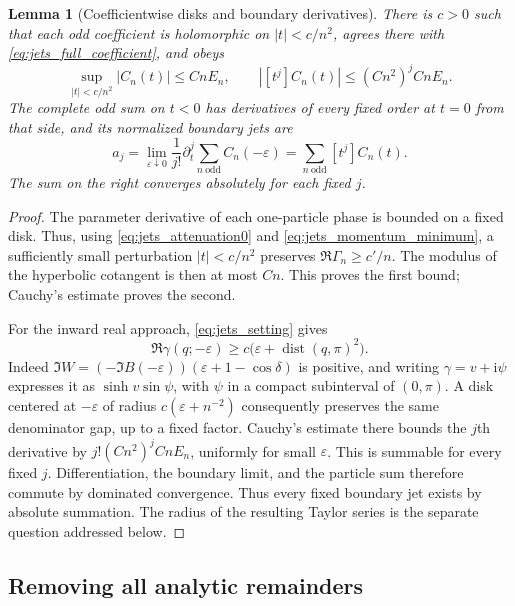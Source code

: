 \documentclass[11pt]{article}
\numberwithin{equation}{section}
\newtheorem{lemma}[theorem]{Lemma}
\theoremstyle{definition}
\newcommand{\ii}{\mathrm i}
\newcommand{\eps}{\varepsilon}
\newcommand{\dist}{\operatorname{dist}}
\begin{document}
\begin{lemma}[Coefficientwise disks and boundary derivatives]
\label{lem:jets_boundary_derivatives}
There is $c>0$ such that each odd coefficient is holomorphic on
$|t|<c/n^2$, agrees there with \eqref{eq:jets_full_coefficient}, and
obeys
\begin{equation}\label{eq:jets_small_disk}
 \sup_{|t|<c/n^2}|C_n(t)|\le CnE_n,
 \qquad |[t^j]C_n(t)|\le (Cn^2)^j CnE_n.
\end{equation}
The complete odd sum on $t<0$ has derivatives of every fixed order at
$t=0$ from that side, and its normalized boundary jets are
\begin{equation}\label{eq:jets_boundary_coefficients}
 a_j=\lim_{\eps\downarrow0}\frac1{j!}
       \partial_t^j\sum_{n\ \mathrm{odd}}C_n(-\eps)
     =\sum_{n\ \mathrm{odd}}[t^j]C_n(t).
\end{equation}
The sum on the right converges absolutely for each fixed $j$.
\end{lemma}

\begin{proof}
The parameter derivative of each one-particle phase is bounded on a
fixed disk. Thus, using \eqref{eq:jets_attenuation0} and
\eqref{eq:jets_momentum_minimum}, a sufficiently small perturbation
$|t|<c/n^2$ preserves $\Re\Gamma_n\ge c'/n$. The modulus of the
hyperbolic cotangent is then at most $Cn$. This proves the first bound;
Cauchy's estimate proves the second.

For the inward real approach, \eqref{eq:jets_setting} gives
\[
 \Re\gamma(q;-\eps)\ge
 c\bigl(\eps+\dist(q,\pi)^2\bigr).
\]
Indeed $\Im W=(-\Im B(-\eps))(\eps+1-\cos\delta)$ is positive,
and writing $\gamma=v+\ii\psi$ expresses it as
$\sinh v\sin\psi$, with $\psi$ in a compact subinterval of
$(0,\pi)$. A disk centered at $-\eps$ of radius
$c(\eps+n^{-2})$ consequently preserves the same denominator gap,
up to a fixed factor. Cauchy's estimate there bounds the $j$th
derivative by $j!(Cn^2)^j CnE_n$, uniformly for small $\eps$.
This is summable for every fixed $j$. Differentiation, the boundary
limit, and the particle sum therefore commute by dominated
convergence. Thus every fixed boundary jet exists by absolute summation. The radius
of the resulting Taylor series is the separate question addressed below.
\end{proof}

\subsection{Removing all analytic remainders}
\end{document}
